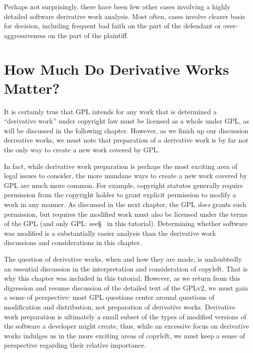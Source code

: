 Perhaps not surprisingly, there have been few other cases involving a highly
detailed software derivative work analysis. Most often, cases involve
clearer basis for decision, including frequent bad faith on the part of
the defendant or over-aggressiveness on the part of the plaintiff.  

\section{How Much Do Derivative Works Matter?}

It is certainly true that GPL intends for any work that is determined a
``derivative work'' under copyright law must be licensed as a whole under
GPL\@, as will be discussed in the following chapter.  However, as we finish
up our discussion derivative works, we must note that preparation of a
derivative work is by far not the only way to create a new work covered by
GPL\@.

In fact, while derivative work preparation is perhaps the most exciting area
of legal issues to consider, the more mundane ways to create a new work
covered by GPL are much more common.  For example, copyright statutes
generally require permission from the copyright holder to grant explicit
permission to modify a work in any manner.  As discussed in the next chapter,
the GPL {\em does} grants such permission, but requires the modified work must
also be licensed under the terms of the GPL (and only GPL:
see\S~\label{GPLv2s6} in this tutorial).  Determining whether software was
modified is a substantially easier analysis than the derivative work
discussions and considerations in this chapter.

The question of derivative works, when and how they are made, is undoubtedly
an essential discussion in the interpretation and consideration of copyleft.
That is why this chapter was included in this tutorial.  However, as we
return from this digression and resume discussion of the detailed text of the
GPLv2, we must gain a sense of perspective: most GPL questions center around
questions of modification and distribution, not preparation of derivative
works.  Derivative work preparation is ultimately a small subset of the types
of modified versions of the software a developer might create, thus, while an
excessive focus on derivative works indulges us in the more exciting areas of
copyleft, we must keep a sense of perspective regarding their relative
importance.


